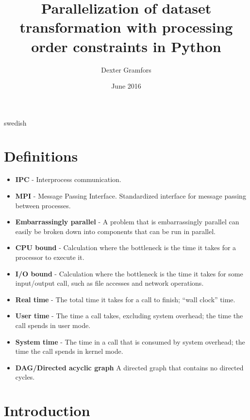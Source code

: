 \documentclass[a4paper,11pt,openany]{kth-mag}
\title{Parallelization of dataset transformation with processing order constraints in Python}
\author{Dexter Gramfors}
\date{June 2016}
\begin{document}
\frontmatter
\pagestyle{empty}
\removepagenumbers
\maketitle
{}
\begin{abstract}
    
\end{abstract}
\clearpage
\begin{foreignabstract}{swedish}
    
\end{foreignabstract}
\clearpage
\tableofcontents*
\clearpage
\listoffigures
\listoftables
\mainmatter
\chapter*{Definitions}
\begin{itemize}[label={}, leftmargin=*]
  \item \textbf{IPC} - Interprocess communication.
  \item \textbf{MPI} - Message Passing Interface. Standardized interface for message passing between processes.
  \item \textbf{Embarrassingly parallel} - A problem that is embarrassingly parallel can easily be broken down into components that
    can be run in parallel. %
  \item \textbf{CPU bound} - Calculation where the bottleneck is the time it takes for a processor to execute it.
  \item \textbf{I/O bound} - Calculation where the bottleneck is the time it takes for some input/output call, such as file accesses
    and network operations.
  \item \textbf{Real time} - The total time it takes for a call to finish; ``wall clock'' time.
  \item \textbf{User time} - The time a call takes, excluding system overhead; the time the call spends in user mode.
  \item \textbf{System time} - The time in a call that is consumed by system overhead; the time the call spends in kernel mode.
  \item \textbf{DAG/Directed acyclic graph} A directed graph that contains no directed cycles.
\end{itemize}

\pagestyle{newchap}
\chapter{Introduction}
    
\end{document}
